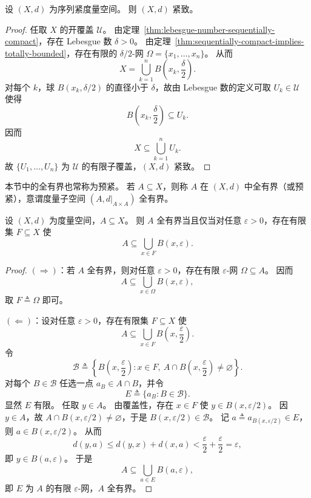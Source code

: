 \documentclass[lang=cn,a4paper,newtx,section]{elegantbook}
\begin{document}
\begin{theorem}\label{thm:sequentially-compact-implies-compact}
  设 $(X,d)$ 为序列紧度量空间。
  则 $(X,d)$ 紧致。
\end{theorem}

\begin{proof}
  任取 $X$ 的开覆盖 $\mathcal{U}$。
  由定理~\ref{thm:lebesgue-number-sequentially-compact}，存在 Lebesgue 数 $\delta>0$。
  由定理~\ref{thm:sequentially-compact-implies-totally-bounded}，存在有限的 $\delta/2$-网 $\Omega=\{x_1,\dots,x_n\}$。
  从而
  \[
    X=\bigcup_{k=1}^{n}B\left(x_k,\frac{\delta}{2}\right).
  \]
  对每个 $k$，球 $B(x_k,\delta/2)$ 的直径小于 $\delta$，故由 Lebesgue 数的定义可取 $U_k\in\mathcal{U}$ 使得
  \[
    B\left(x_k,\frac{\delta}{2}\right)\subseteq U_k.
  \]
  因而
  \[
    X\subseteq\bigcup_{k=1}^{n}U_k.
  \]
  故 $\{U_1,\dots,U_n\}$ 为 $\mathcal{U}$ 的有限子覆盖，$(X,d)$ 紧致。
\end{proof}

\begin{remark}
  本节中的全有界也常称为预紧。
  若 $A\subseteq X$，则称 $A$ 在 $(X,d)$ 中全有界（或预紧），意谓度量子空间 $(A,d|_{A\times A})$ 全有界。
\end{remark}

\begin{lemma}\label{lem:totally-bounded-subset-cover}
  设 $(X,d)$ 为度量空间，$A\subseteq X$。
  则 $A$ 全有界当且仅当对任意 $\varepsilon>0$，存在有限集 $F\subseteq X$ 使
  \[
    A\subseteq\bigcup_{x\in F}B(x,\varepsilon).
  \]
\end{lemma}

\begin{proof}
  $(\Rightarrow)$：若 $A$ 全有界，则对任意 $\varepsilon>0$，存在有限 $\varepsilon$-网 $\Omega\subseteq A$。
  因而
  \[
    A\subseteq\bigcup_{x\in\Omega}B(x,\varepsilon),
  \]
  取 $F\triangleq\Omega$ 即可。

  $(\Leftarrow)$：设对任意 $\varepsilon>0$，存在有限集 $F\subseteq X$ 使
  \[
    A\subseteq\bigcup_{x\in F}B\left(x,\frac{\varepsilon}{2}\right).
  \]
  令
  \[
    \mathcal{B}\triangleq\left\{B\left(x,\frac{\varepsilon}{2}\right):x\in F,\ A\cap B\left(x,\frac{\varepsilon}{2}\right)\ne\varnothing\right\}.
  \]
  对每个 $B\in\mathcal{B}$ 任选一点 $a_B\in A\cap B$，并令
  \[
    E\triangleq\{a_B:B\in\mathcal{B}\}.
  \]
  显然 $E$ 有限。
  任取 $y\in A$。
  由覆盖性，存在 $x\in F$ 使 $y\in B(x,\varepsilon/2)$。
  因 $y\in A$，故 $A\cap B(x,\varepsilon/2)\ne\varnothing$，于是 $B(x,\varepsilon/2)\in\mathcal{B}$。
  记 $a\triangleq a_{B(x,\varepsilon/2)}\in E$，则 $a\in B(x,\varepsilon/2)$。
  从而
  \[
    d(y,a)\le d(y,x)+d(x,a)<\frac{\varepsilon}{2}+\frac{\varepsilon}{2}=\varepsilon,
  \]
  即 $y\in B(a,\varepsilon)$。
  于是
  \[
    A\subseteq\bigcup_{a\in E}B(a,\varepsilon),
  \]
  即 $E$ 为 $A$ 的有限 $\varepsilon$-网，$A$ 全有界。
\end{proof}
\end{document}
